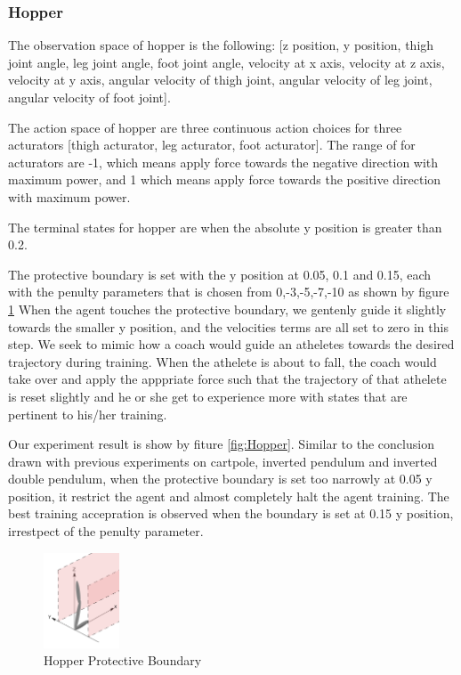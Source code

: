 \documentclass[journal]{IEEEtran}
\begin{document}
\subsubsection{Hopper}
The observation space of hopper is the following: [z position, y position, thigh joint angle, leg joint angle, foot joint angle, velocity at x axis, velocity at z axis, velocity at y axis, angular velocity of thigh joint, angular velocity of leg joint, angular velocity of foot joint].

The action space of hopper are three continuous action choices for three acturators [thigh acturator, leg acturator, foot acturator]. The range of for acturators are -1, which means apply force towards the negative direction with maximum power, and 1 which means apply force towards the positive direction with maximum power.

The terminal states for hopper are when the absolute y position is greater than 0.2.

The protective boundary is set with the y position at 0.05, 0.1 and 0.15, each with the penulty parameters that is chosen from 0,-3,-5,-7,-10 as shown by figure \ref{fig:hopperPB} When the agent touches the protective boundary, we gentenly guide it slightly towards the smaller y position, and the velocities terms are all set to zero in this step. We seek to mimic how a coach would guide an atheletes towards the desired trajectory during training. When the athelete is about to fall, the coach would take over and apply the apppriate force such that the trajectory of that athelete is reset slightly and he or she get to experience more with states that are pertinent to his/her training.

Our experiment result is show by fiture \ref{fig:Hopper}. Similar to the conclusion drawn with previous experiments on cartpole, inverted pendulum and inverted double pendulum, when the protective boundary is set too narrowly at 0.05 y position, it restrict the agent and almost completely halt the agent training. The best training accepration is observed when the boundary is set at 0.15 y position, irrestpect of the penulty parameter.

\begin{figure}
     \centering
      \includegraphics[width=0.2\textwidth]{hopper.png}
      \caption{Hopper Protective Boundary}
      \label{fig:hopperPB}
\end{figure}
\end{document}
